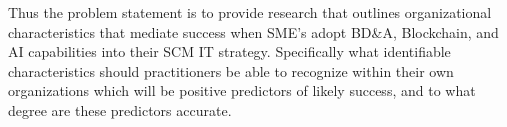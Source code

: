 Thus the problem statement is to provide research that outlines organizational characteristics that mediate success when SME's adopt BD\&A, Blockchain, and AI capabilities into their SCM IT strategy. Specifically what identifiable characteristics should practitioners be able to recognize within their own organizations which will be positive predictors of likely success, and to what degree are these predictors accurate.
